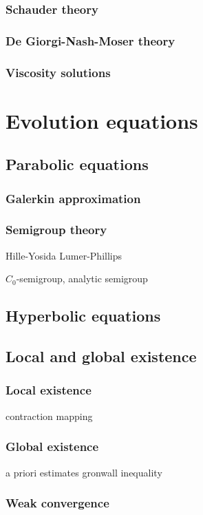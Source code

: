 \documentclass{../../large}
\begin{document}
\section{Schauder theory}
\section{De Giorgi-Nash-Moser theory}
\section{Viscosity solutions}








\part{Evolution equations}

\chapter{Parabolic equations}
\section{Galerkin approximation}
\section{Semigroup theory}

Hille-Yosida
Lumer-Phillips

$C_0$-semigroup, analytic semigroup

\chapter{Hyperbolic equations}

\chapter{Local and global existence}
\section{Local existence}
contraction mapping
\section{Global existence}
a priori estimates
gronwall inequality
\section{Weak convergence}
\end{document}

